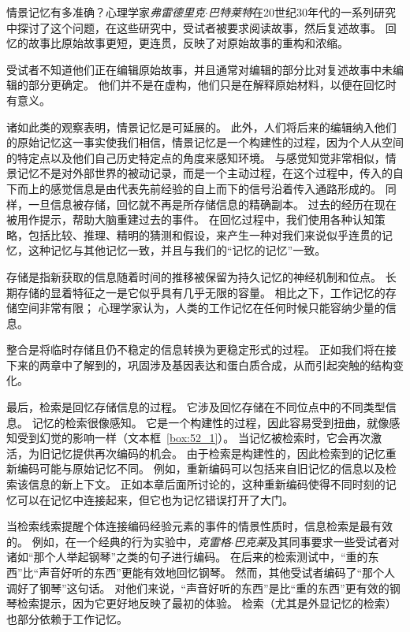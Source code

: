 \begin{proposition}[情景记忆在回忆过程中会发生变化] \label{box:52_1}
	
	\quad \quad 情景记忆有多准确？心理学家\textit{弗雷德里克$\cdot$巴特莱特}在20世纪30年代的一系列研究中探讨了这个问题，在这些研究中，受试者被要求阅读故事，然后复述故事。
	回忆的故事比原始故事更短，更连贯，反映了对原始故事的重构和浓缩。
	
	\quad \quad 受试者不知道他们正在编辑原始故事，并且通常对编辑的部分比对复述故事中未编辑的部分更确定。
	他们并不是在虚构，他们只是在解释原始材料，以便在回忆时有意义。
	
	\quad \quad 诸如此类的观察表明，情景记忆是可延展的。
	此外，人们将后来的编辑纳入他们的原始记忆这一事实使我们相信，情景记忆是一个构建性的过程，因为个人从空间的特定点以及他们自己历史特定点的角度来感知环境。
	与感觉知觉非常相似，情景记忆不是对外部世界的被动记录，而是一个主动过程，在这个过程中，传入的自下而上的感觉信息是由代表先前经验的自上而下的信号沿着传入通路形成的。
	同样，一旦信息被存储，回忆就不再是所存储信息的精确副本。
	过去的经历在现在被用作提示，帮助大脑重建过去的事件。
	在回忆过程中，我们使用各种认知策略，包括比较、推理、精明的猜测和假设，来产生一种对我们来说似乎连贯的记忆，这种记忆与其他记忆一致，并且与我们的“记忆的记忆”一致。
	
\end{proposition}


存储是指新获取的信息随着时间的推移被保留为持久记忆的神经机制和位点。
长期存储的显着特征之一是它似乎具有几乎无限的容量。
相比之下，工作记忆的存储空间非常有限；
心理学家认为，人类的工作记忆在任何时候只能容纳少量的信息。


整合是将临时存储且仍不稳定的信息转换为更稳定形式的过程。
正如我们将在接下来的两章中了解到的，巩固涉及基因表达和蛋白质合成，从而引起突触的结构变化。


最后，检索是回忆存储信息的过程。
它涉及回忆存储在不同位点中的不同类型信息。
记忆的检索很像感知。
它是一个构建性的过程，因此容易受到扭曲，就像感知受到幻觉的影响一样（文本框~\ref{box:52_1}）。
当记忆被检索时，它会再次激活，为旧记忆提供再次编码的机会。
由于检索是构建性的，因此检索到的记忆重新编码可能与原始记忆不同。
例如，重新编码可以包括来自旧记忆的信息以及检索该信息的新上下文。
正如本章后面所讨论的，这种重新编码使得不同时刻的记忆可以在记忆中连接起来，但它也为记忆错误打开了大门。


当检索线索提醒个体连接编码经验元素的事件的情景性质时，信息检索是最有效的。
例如，在一个经典的行为实验中，\textit{克雷格$\cdot$巴克莱}及其同事要求一些受试者对诸如“那个人举起钢琴”之类的句子进行编码。
在后来的检索测试中，“重的东西”比“声音好听的东西”更能有效地回忆钢琴。
然而，其他受试者编码了“那个人调好了钢琴”这句话。
对他们来说，“声音好听的东西”是比“重的东西”更有效的钢琴检索提示，因为它更好地反映了最初的体验。
检索（尤其是外显记忆的检索）也部分依赖于工作记忆。




